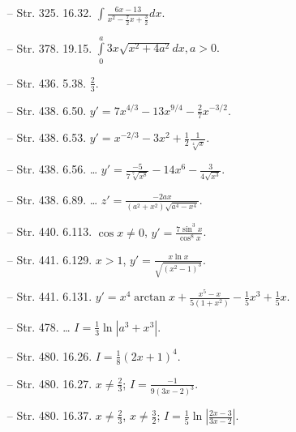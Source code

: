 \documentclass[a4paper,11pt]{article}
\begin{document}
\begin{itemize}

\item[--] Str. 325. 16.32.
  $\int \frac{ 6 x - 13 }{ x^{ 2 } - \frac{ 7 }{ 2 } x + \frac{ 3 }{ 2
    } } dx$.

\item[--] Str. 378. 19.15.
  $\int \limits_{ 0 }^{ a } 3x \sqrt{ x^{ 2 } + 4 a^{ 2 } } dx, a > 0
  \textrm{.}$

\item[--] Str. 436. 5.38. $\frac{ 2 }{ 3 }$.

\item[--] Str. 438. 6.50.
  $y' = 7 x^{ 4 / 3 } - 13 x^{ 9 / 4 } - \frac{ 2 }{ 7 } x^{ -3 / 2 }
  \textrm{.}$

\item[--] Str. 438. 6.53.
  $y' = x^{ -2 / 3 } - 3 x^{ 2 } + \frac{ 1 }{ 2 } \frac{ 1 }{ \sqrt[
    4 ]{ x } }$.

\item[--] Str. 438. 6.56. \ldots
  $y' = \frac{ -5 }{ 7 \sqrt[ 7 ]{ x^{ 8 } } } - 14 x^{ 6 } - \frac{ 3
  }{ 4 \sqrt{ x^{ 3 } } }$.

\item[--] Str. 438. 6.89. \ldots
  $z' = \frac{ -2 a x }{ ( a^{ 2 } + x^{ 2 } ) \sqrt{ a^{ 4 } - x^{ 4
      } } }$.

\item[--] Str. 440. 6.113. $\cos x \neq 0$,
  $y' = \frac{ 7 \sin^{ 3 } x }{ \cos^{ 8 } x }$.

\item[--] Str. 441. 6.129. $x > 1$,
  $y' = \frac{ x \ln x }{ \sqrt{ ( x^{ 2 } - 1 )^{ 3 } } }$.

\item[--] Str. 441. 6.131.
  $y' = x^{ 4 } \arctan x + \frac{ x^{ 5 } - x }{ 5 ( 1 + x^{ 2 } ) }
  - \frac{ 1 }{ 5 } x^{ 3 } + \frac{ 1 }{ 5 } x$.
\item[--] Str. 478. \ldots
  $I = \frac{ 1 }{ 3 } \ln | a^{ 3 } + x^{ 3 } |$.

\item[--] Str. 480. 16.26. $I = \frac{ 1 }{ 8 } ( 2 x + 1 )^{ 4 }$.

\item[--] Str. 480. 16.27. $x \neq \frac{ 2 }{ 3 }$;
  $I = \frac{ -1 }{ 9 ( 3 x - 2 )^{ 3 } }$.

\item[--] Str. 480. 16.37. $x \neq \frac{ 2 }{ 3 }$,
  $x \neq \frac{ 3 }{ 2 }$;
  $I = \frac{ 1 }{ 5 } \ln | \frac{ 2 x - 3 }{ 3 x - 2 } |$.

\end{itemize}
\end{document}
